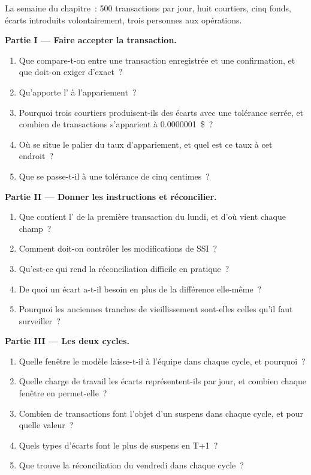 \begin{problem}\label{pb:pl:post-trade-systems:1}
La semaine du chapitre~: 500 transactions par jour, huit courtiers, cinq fonds, écarts introduits volontairement, trois personnes aux opérations.

\medskip\noindent\textbf{Partie I --- Faire accepter la transaction.}
\begin{enumerate}
\item Que compare-t-on entre une transaction enregistrée et une confirmation, et que doit-on exiger d'exact~?
\item Qu'apporte l' à l'appariement~?
\item Pourquoi trois courtiers produisent-ils des écarts avec une tolérance serrée, et combien de transactions s'apparient à 0.0000001~\$~?
\item Où se situe le palier du taux d'appariement, et quel est ce taux à cet endroit~?
\item Que se passe-t-il à une tolérance de cinq centimes~?
\end{enumerate}

\medskip\noindent\textbf{Partie II --- Donner les instructions et réconcilier.}
\begin{enumerate}[resume]
\item Que contient l' de la première transaction du lundi, et d'où vient chaque champ~?
\item Comment doit-on contrôler les modifications de SSI~?
\item Qu'est-ce qui rend la réconciliation difficile en pratique~?
\item De quoi un écart a-t-il besoin en plus de la différence elle-même~?
\item Pourquoi les anciennes tranches de vieillissement sont-elles celles qu'il faut surveiller~?
\end{enumerate}

\medskip\noindent\textbf{Partie III --- Les deux cycles.}
\begin{enumerate}[resume]
\item Quelle fenêtre le modèle laisse-t-il à l'équipe dans chaque cycle, et pourquoi~?
\item Quelle charge de travail les écarts représentent-ils par jour, et combien chaque fenêtre en permet-elle~?
\item Combien de transactions font l'objet d'un suspens dans chaque cycle, et pour quelle valeur~?
\item Quels types d'écarts font le plus de suspens en T+1~?
\item Que trouve la réconciliation du vendredi dans chaque cycle~?
\end{enumerate}


\end{problem}
